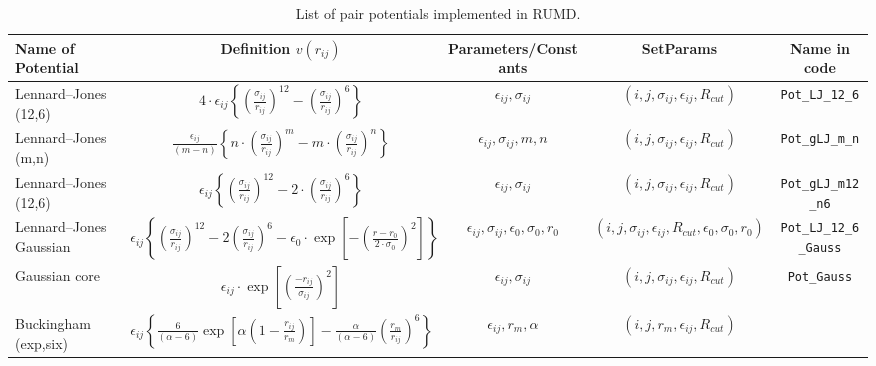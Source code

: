\begin{sidewaystable}

  \advance\leftskip-3cm
  \label{pot_list}
  \caption{List of pair potentials implemented in RUMD.}
  
  \begin{tabular}{ | l | c | c | c | c | }
    \hline
    Name of Potential 
    & \textbf{Definition} $v(r_{ij})$ 
    & Parameters/Constants 
    & SetParams 
    & Name in code \\
    \hline
    Lennard--Jones (12,6) 
    & $4\cdot \epsilon_{ij} \left\{ \left ( \frac{\sigma_{ij}}{r_{ij}} \right )^{12} - \left ( \frac{\sigma_{ij}}{r_{ij}} \right )^{6}  \right\} $
    & $\epsilon_{ij}, \sigma_{ij} $ 
    &  $(i, j, \sigma_{ij}, \epsilon_{ij}, R_{cut})$ 
    & \verb=Pot_LJ_12_6= \\
    Lennard--Jones (m,n) 
    & $ \frac{\epsilon_{ij}}{(m - n)} \left\{ n \cdot\left ( \frac{\sigma_{ij}}{r_{ij}} \right )^{m} - m \cdot \left ( \frac{\sigma_{ij}}{r_{ij}} \right )^{n}  \right\} $
    & $\epsilon_{ij}, \sigma_{ij}, m, n $ 
    & $(i, j, \sigma_{ij}, \epsilon_{ij}, R_{cut})$ 
    & \verb=Pot_gLJ_m_n= \\
    Lennard--Jones (12,6) 
    & $ \epsilon_{ij} \left\{ \left ( \frac{\sigma_{ij}}{r_{ij}} \right )^{12} - 2\cdot \left ( \frac{\sigma_{ij}}{r_{ij}} \right )^{6}  \right\} $
    & $\epsilon_{ij}, \sigma_{ij} $ 
    & $(i, j, \sigma_{ij}, \epsilon_{ij}, R_{cut})$ 
    & \verb=Pot_gLJ_m12_n6= \\
    Lennard--Jones Gaussian 
    & $ \epsilon_{ij} \left\{ \left ( \frac{\sigma_{ij}}{r_{ij}} \right )^{12} - 2\left ( \frac{\sigma_{ij}}{r_{ij}} \right )^{6} 
    - \epsilon_0 \cdot \exp\left[- \left ( \frac{r - r_0}{2 \cdot \sigma_0} \right ) ^2 \right] \right\}$ 
    & $\epsilon_{ij}, \sigma_{ij}, \epsilon_0, \sigma_0, r_0$ 
    & $(i, j, \sigma_{ij}, \epsilon_{ij}, R_{cut}, \epsilon_0, \sigma_0, r_0)$ 
    & \verb=Pot_LJ_12_6_Gauss= \\
    Gaussian core 
    & $ \epsilon_{ij} \cdot \exp\left[ \left ( \frac{-r_{ij}}{\sigma_{ij} } \right ) ^2 \right]$
    & $\epsilon_{ij}, \sigma_{ij}$ 
    & $(i, j, \sigma_{ij}, \epsilon_{ij}, R_{cut})$ 
    & \verb=Pot_Gauss= \\
    Buckingham (exp,six) 
    & $ \epsilon_{ij} \left\{ \frac{6}{(\alpha -6)}\exp \left[\alpha \left ( 1-\frac{r_{ij}}{r_m} \right ) \right] - \frac{\alpha}{(\alpha -6)}\left ( \frac{r_m}{r_{ij}} \right )^{6} \right\} $
    & $\epsilon_{ij}, r_m, \alpha $ 
    &  $(i, j, r_m, \epsilon_{ij}, R_{cut})$ 

\end{tabular}
\end{sidewaystable}
